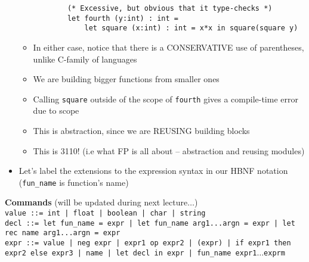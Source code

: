 \begin{itemize}
\begin{itemize}
\begin{lstlisting}
        (* Excessive, but obvious that it type-checks *)
        let fourth (y:int) : int =
            let square (x:int) : int = x*x in square(square y)
        \end{lstlisting}
        \item In either case, notice that there is a CONSERVATIVE use of parentheses, unlike \textsf{C}-family of languages
        \item We are building bigger functions from smaller ones
        \item Calling \texttt{square} outside of the scope of \texttt{fourth} gives a compile-time error due to scope
        \item This is abstraction, since we are REUSING building blocks
        \item This is 3110! (i.e what FP is all about -- abstraction and reusing modules)
    \end{itemize}
    \item Let's label the extensions to the expression syntax in our HBNF notation (\texttt{fun\_name} is function's name)
\end{itemize}

\noindent
\textbf{Commands} (will be updated during next lecture$\ldots$) \\
\texttt{value ::= int | float | boolean | char | string} \\
\texttt{decl ::= \lstinline{let fun_name = expr} | \lstinline{let fun_name arg1...argn = expr} | \lstinline{let rec name arg1...argn = expr}} \\
\texttt{expr ::= value | neg expr | expr1 op expr2 | (expr) | \lstinline{if expr1 then expr2 else expr3} | name | \lstinline{let decl in expr} | fun\_name expr1$\ldots$exprm} \\
